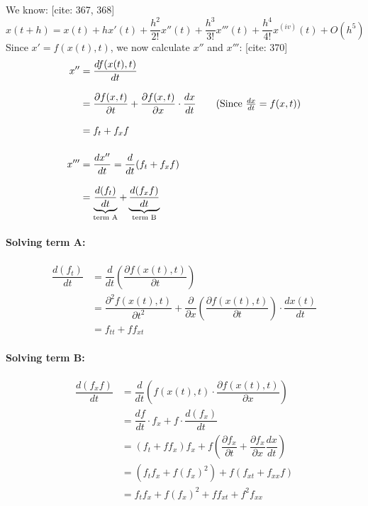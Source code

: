 \documentclass[10pt,twoside]{report}
\begin{document}
We know: [cite: 367, 368]
\begin{equation*}
    x(t+h) = x(t) + h x'(t) + \dfrac{h^2}{2!}x''(t) + \dfrac{h^3}{3!}x'''(t) + \dfrac{h^4}{4!}x^{(iv)}(t) + O(h^5)
\end{equation*}
Since $x' = f(x(t),t)$, we now calculate $x''$ and $x'''$: [cite: 370]
\begin{align*}
    x'' &= \dfrac{df(x(t),t)}{dt} \\[8pt]
        &= \dfrac{\partial f(x,t)}{\partial t} + \dfrac{\partial f(x,t)}{\partial x} \cdot \dfrac{dx}{dt} \tag{Since $\frac{dx}{dt}=f(x,t)$} \\[8pt]
        &= f_t + f_x f \\[12pt]
    x''' &= \dfrac{dx''}{dt} = \dfrac{d}{dt}(f_t + f_x f) \\[8pt]
         &= \underbrace{\dfrac{d(f_t)}{dt}}_{\text{term A}} + \underbrace{\dfrac{d(f_x f)}{dt}}_{\text{term B}}
\end{align*}

\paragraph{Solving term A:}
\begin{align*}
    \dfrac{d(f_t)}{dt} &= \dfrac{d}{dt} \left( \dfrac{\partial f(x(t),t)}{\partial t} \right) \\[8pt]
    &= \dfrac{\partial^2 f(x(t),t)}{\partial t^2} + \dfrac{\partial}{\partial x} \left( \dfrac{\partial f(x(t),t)}{\partial t} \right) \cdot \dfrac{dx(t)}{dt} \\[8pt]
    &= f_{tt} + f f_{xt}
\end{align*}

\paragraph{Solving term B:}
\begin{align*}
    \dfrac{d(f_x f)}{dt} &= \dfrac{d}{dt} \left( f(x(t),t) \cdot \dfrac{\partial f(x(t),t)}{\partial x} \right) \\[8pt]
    &= \dfrac{df}{dt} \cdot f_x + f \cdot \dfrac{d(f_x)}{dt} \\[8pt]
    &= (f_t + f f_x) f_x + f \left( \dfrac{\partial f_x}{\partial t} + \dfrac{\partial f_x}{\partial x} \dfrac{dx}{dt} \right) \\[8pt]
    &= (f_t f_x + f (f_x)^2) + f (f_{xt} + f_{xx} f) \\[8pt]
    &= f_t f_x + f (f_x)^2 + f f_{xt} + f^2 f_{xx}
\end{align*}
\end{document}
